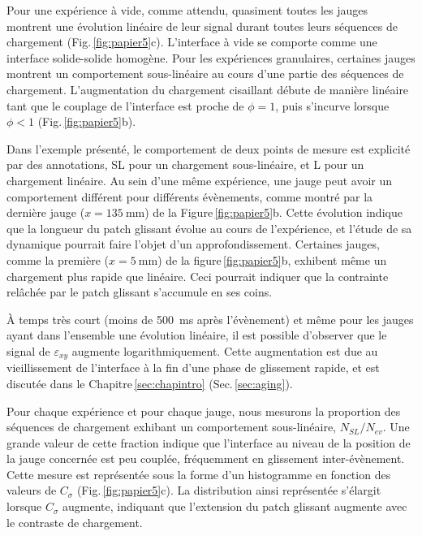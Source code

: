 Pour une expérience à vide, comme attendu, quasiment toutes les jauges montrent une évolution linéaire de leur signal durant toutes leurs séquences de chargement (Fig.\,\ref{fig:papier5}c). L'interface à vide se comporte comme une interface solide-solide homogène. Pour les expériences granulaires, certaines jauges montrent un comportement sous-linéaire au cours d'une partie des séquences de chargement. L'augmentation du chargement cisaillant débute de manière linéaire tant que le couplage de l'interface est proche de $\phi=1$, puis s'incurve lorsque $\phi<1$ (Fig.\,\ref{fig:papier5}b).


Dans l'exemple présenté, le comportement de deux points de mesure est explicité par des annotations, SL pour un chargement sous-linéaire, et L pour un chargement linéaire.
Au sein d'une même expérience, une jauge peut avoir un comportement différent pour différents évènements, comme montré par la dernière jauge ($x=\SI{135}{\milli\meter}$) de la Figure\,\ref{fig:papier5}b.
Cette évolution indique que la longueur du patch glissant évolue au cours de l'expérience, et l'étude de sa dynamique pourrait faire l'objet d'un approfondissement.
Certaines jauges, comme la première ($x=\SI{5}{\milli\meter}$) de la figure\,\ref{fig:papier5}b, exhibent même un chargement plus rapide que linéaire. Ceci pourrait indiquer que la contrainte relâchée par le patch glissant s'accumule en ses coins.

À temps très court (moins de \SI{500}{\milli\second} après l'évènement) et même pour les jauges ayant dans l'ensemble une évolution linéaire, il est possible d'observer que le signal de $\varepsilon_{xy}$ augmente logarithmiquement. Cette augmentation  est due au vieillissement de l'interface à la fin d'une phase de glissement rapide, et est discutée dans le Chapitre\,\ref{sec:chapintro} (Sec.\,\ref{sec:aging}).

Pour chaque expérience et pour chaque jauge, nous mesurons la proportion des séquences de chargement exhibant un comportement sous-linéaire, $N_{SL}/N_{ev}$. Une grande valeur de cette fraction indique que l'interface au niveau de la position de la jauge concernée est peu couplée, fréquemment en glissement inter-évènement. Cette mesure est représentée sous la forme d'un histogramme en fonction des valeurs de $C_\sigma$ (Fig.\,\ref{fig:papier5}c). La distribution ainsi représentée s'élargit lorsque $C_\sigma$ augmente, indiquant que l'extension du patch glissant augmente avec le contraste de chargement.




